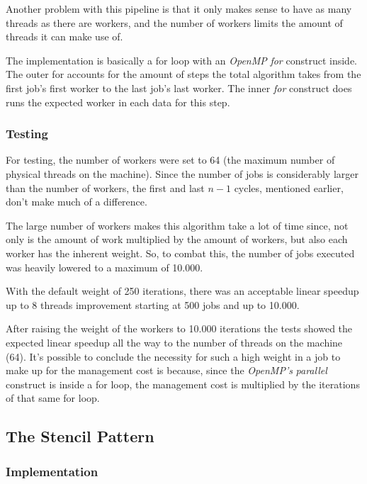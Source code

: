 \documentclass[9pt,journal]{IEEEtran}
\begin{document}
Another problem with this pipeline is that it only makes sense to have as many threads as there are workers, and the number of workers limits the amount of threads it can make use of.

The implementation is basically a for loop with an \textit{OpenMP} \textit{for} construct inside. The outer for accounts for the amount of steps the total algorithm takes from the first job's first worker to the last job's last worker. The inner \textit{for} construct does runs the expected worker in each data for this step.

\subsubsection{Testing}

For testing, the number of workers were set to 64 (the maximum number of physical threads on the machine). Since the number of jobs is considerably larger than the number of workers, the first and last $ n - 1 $ cycles, mentioned earlier, don't make much of a difference.

The large number of workers makes this algorithm take a lot of time since, not only is the amount of work multiplied by the amount of workers, but also each worker has the inherent weight. So, to combat this, the number of jobs executed was heavily lowered to a maximum of 10.000.

With the default weight of 250 iterations, there was an acceptable linear speedup up to 8 threads improvement starting at 500 jobs and up to 10.000.

After raising the weight of the workers to 10.000 iterations the tests showed the expected linear speedup all the way to the number of threads on the machine (64). It's possible to conclude the necessity for such a high weight in a job to make up for the management cost is because, since the \textit{OpenMP's} \textit{parallel} construct is inside a for loop, the management cost is multiplied by the iterations of that same for loop.

\subsection{The Stencil Pattern}

\subsubsection{Implementation}
\end{document}
